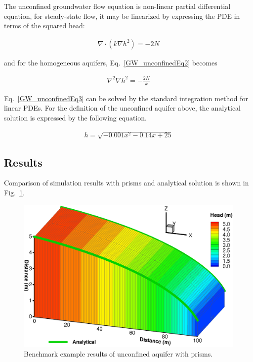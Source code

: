 The unconfined groundwater flow equation is non-linear partial differential equation, for steady-state flow,  it may be linearized by expressing the PDE in terms of the squared head:

\begin{eqnarray}
 \nabla\cdot(k\nabla h^2) = -2N
\label{GW_unconfinedEq2}
\end{eqnarray}

and for the homogeneous aquifers, Eq.~\ref{GW_unconfinedEq2} becomes

\begin{eqnarray}
 \nabla ^2 \nabla h^2 = - \frac{2N}{k}
\label{GW_unconfinedEq3}
\end{eqnarray}

Eq.~\ref{GW_unconfinedEq3} can be solved by the standard integration method for linear PDEs. For the definition of the unconfined aquifer above, the analytical solution is expressed by the following equation.

\begin{eqnarray}
 h=\sqrt{-0.001 x^2-0.14x+25}
\label{UGW_analytical}
\end{eqnarray}  
%
\subsection{Results}
%
Comparison of simulation results with prisms and analytical solution is shown in Fig.~\ref{GW_Results_uc}.
%
\begin{figure} [H]
 \centering
 \vspace{-10pt}
\includegraphics[width=0.7\columnwidth] {Chapter5/figure/uc_pris.eps}
\vspace{-10pt}
\caption{Benchmark example results of unconfined aquifer with prisms.}
\vspace{-10pt}
 \label{GW_Results_uc}
\end{figure}
%
